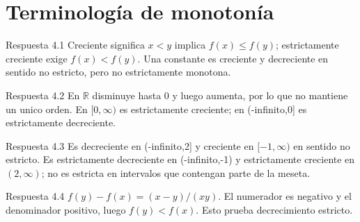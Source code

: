 \documentclass[10pt,a4paper,oneside,openany]{book}
\begin{document}
\section{Terminología de monotonía}
\begin{PSevenAnswerFixed}{Respuesta 4.1}
Creciente significa \(x<y\) implica \(f(x)\le f(y)\); estrictamente creciente exige \(f(x)<f(y)\). Una constante es creciente y decreciente en sentido no estricto, pero no estrictamente monotona.
\end{PSevenAnswerFixed}
\begin{PSevenAnswerFixed}{Respuesta 4.2}
En \(\mathbb{R}\) disminuye hasta \(0\) y luego aumenta, por lo que no mantiene un unico orden. En \([0,\infty )\) es estrictamente creciente; en (-infinito,0] es estrictamente decreciente.
\end{PSevenAnswerFixed}
\begin{PSevenAnswerFixed}{Respuesta 4.3}
Es decreciente en (-infinito,2] y creciente en \([-1,\infty )\) en sentido no estricto. Es estrictamente decreciente en (-infinito,-1) y estrictamente creciente en \((2,\infty )\); no es estricta en intervalos que contengan parte de la meseta.
\end{PSevenAnswerFixed}
\begin{PSevenAnswerFixed}{Respuesta 4.4}
\(f(y)-f(x)=(x-y)/(xy)\). El numerador es negativo y el denominador positivo, luego \(f(y)<f(x)\). Esto prueba decrecimiento estricto.
\end{PSevenAnswerFixed}
\end{document}
